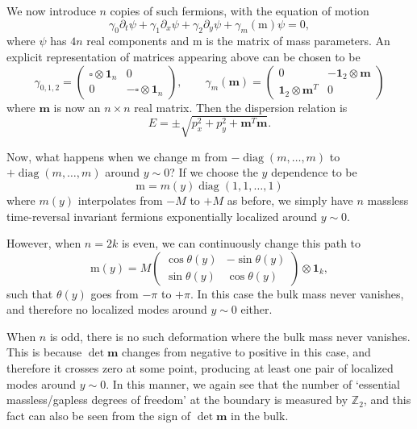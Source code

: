 \documentclass[12pt]{article}
\numberwithin{equation}{section}
\numberwithin{figure}{section}
\theoremstyle{remark}
\def\bZ{\mathbb{Z}}
\def\diag{\mathop{\mathrm{diag}}\nolimits}
\begin{document}
We now introduce $n$ copies of such fermions, with the equation of motion \begin{equation}
\gamma_0 \partial_t\psi +\gamma_1\partial_x\psi + \gamma_2\partial_y\psi + \gamma_m(\mathrm{m}) \psi =0,
\end{equation} where $\psi$ has $4n$ real components
and $\mathrm{m}$ is the matrix of mass parameters.
An explicit representation of matrices appearing above
can be chosen to be  \begin{equation}
\gamma_{0,1,2}=\begin{pmatrix}
\square \otimes \mathbf{1}_n& 0 \\
0 & -\square\otimes \mathbf{1}_n
\end{pmatrix}, \qquad
\gamma_m(\mathbf{m})=\begin{pmatrix}
0 & -\mathbf{1}_2 \otimes \mathbf{m}\\
\mathbf{1}_2 \otimes \mathbf{m}^{T} & 0
\end{pmatrix}
\end{equation} where $\mathbf{m}$ is now an $n\times n$ real matrix.
Then the dispersion relation is \begin{equation}
E=\pm \sqrt{p_x^2 + p_y^2 + \mathbf{m}^T \mathbf{m}}.
\end{equation}

Now, what happens when we change $\mathrm{m}$ from $-\diag(m,\ldots,m)$ to 
$+\diag(m,\ldots,m)$ around $y\sim 0$? 
If we choose the $y$ dependence to be \begin{equation}
\mathrm{m}=m(y) \diag(1,1,\ldots, 1)
\end{equation} where  $m(y)$ interpolates from $-M$ to $+M$ as before,
we simply have $n$ massless time-reversal invariant fermions exponentially localized around $y\sim 0$.

However, when $n=2k$ is even, we can continuously change this path to \begin{equation}
\mathrm{m}(y) = M \begin{pmatrix}
\cos\theta(y) & -\sin\theta(y) \\
\sin\theta(y) & \cos\theta(y)
\end{pmatrix} \otimes \mathbf{1}_k,
\end{equation}such that $\theta(y)$ goes from $-\pi$ to $+\pi$.
In this case the bulk mass never vanishes, and therefore no localized modes around $y\sim 0$ either.

When $n$ is odd, there is no such deformation where the bulk mass never vanishes.
This is because $\det \mathbf{m}$ changes from negative to positive in this case,
and therefore it crosses zero at some point, producing at least one pair of localized modes around $y\sim 0$.
In this manner, we again see that the number of `essential massless/gapless degrees of freedom' at the boundary 
is measured by $\bZ_2$,
and this fact can also be seen from the sign of $\det\mathbf{m}$ in the bulk.
\end{document}
